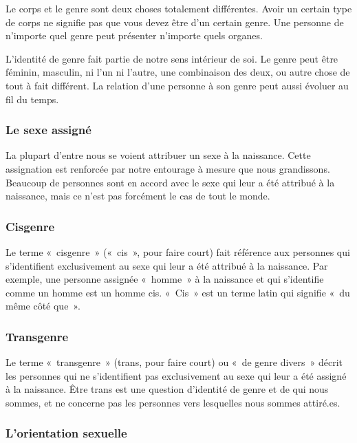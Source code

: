 \documentclass[12pt,openany]{book}
\begin{document}
\noindent Le corps et le genre sont deux choses totalement différentes. Avoir un certain type de corps ne signifie pas que vous devez être d’un certain genre. Une personne de n’importe quel genre peut présenter n’importe quels organes.

L’identité de genre fait partie de notre sens intérieur de soi. Le genre peut être féminin, masculin, ni l’un ni l’autre, une combinaison des deux, ou autre chose de tout à fait différent. La relation d’une personne à son genre peut aussi évoluer au fil du temps.

\subsubsection*{Le sexe assigné}

\noindent La plupart d’entre nous se voient attribuer un sexe à la naissance. Cette assignation est renforcée par notre entourage à mesure que nous grandissons. Beaucoup de personnes sont en accord avec le sexe qui leur a été attribué à la naissance, mais ce n’est pas forcément le cas de tout le monde.

\subsubsection*{Cisgenre}

\noindent Le terme \mbox{« cisgenre »} (\mbox{« cis »}, pour faire court) fait référence aux personnes qui s’identifient exclusivement au sexe qui leur a été attribué à la naissance. Par exemple, une personne assignée \mbox{« homme »} à la naissance et qui s’identifie comme un homme est un homme cis.
\mbox{« Cis »} est un terme latin qui signifie \mbox{« d}u même côté qu\mbox{e »}.

\subsubsection*{Transgenre} 

Le terme \mbox{« transgenre »} (trans, pour faire court) ou \mbox{« d}e genre diver\mbox{s »} décrit les personnes qui ne s’identifient pas exclusivement au sexe qui leur a été assigné à la naissance. Être trans est une question d’identité de genre et de qui nous sommes, et ne concerne pas les personnes vers lesquelles nous sommes attiré.es.

\subsubsection*{L’orientation sexuelle} 
\end{document}
